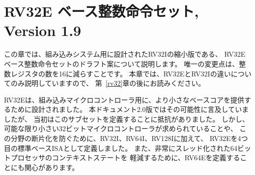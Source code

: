\begin{comment}
\chapter{RV32E Base Integer Instruction Set, Version 1.9}
\end{comment}
\chapter{RV32E ベース整数命令セット, Version 1.9}
\label{rv32e}

\begin{comment}
This chapter describes a draft proposal for the RV32E base integer
instruction set, which is a reduced version of RV32I designed for
embedded systems.  The only change is to reduce the number of integer
registers to 16.  This chapter only outlines the differences between
RV32E and RV32I, and so should be read after Chapter~\ref{rv32}.
\end{comment}

この章では、組み込みシステム用に設計されたRV32Iの縮小版である、
RV32Eベース整数命令セットのドラフト案について説明します。
唯一の変更点は、整数レジスタの数を16に減らすことです。
本章では、RV32EとRV32Iの違いについてのみ説明していますので、
第~\ref{rv32}章の後にお読みください。

\begin{commentary}
\begin{comment}
RV32E was designed to provide an even smaller base core for embedded
microcontrollers.  Although we had mentioned this possibility in
version 2.0 of this document, we initially resisted defining this
subset. However, given the demand for the smallest possible 32-bit
microcontroller, and in the interests of preempting fragmentation in
this space, we have now defined RV32E as a fourth standard base ISA in
addition to RV32I, RV64I, and RV128I.  There is also interest in
defining an RV64E to reduce context state for highly threaded 64-bit
processors.
\end{comment}

RV32Eは、組み込みマイクロコントローラ用に、より小さなベースコアを提供するために設計されました。 
本ドキュメント2.0版ではその可能性に言及していましたが、
当初はこのサブセットを定義することに抵抗がありました。
しかし、可能な限り小さい32ビットマイクロコントローラが求められていることや、
この分野の断片化を防ぐために、RV32I、RV64I、RV128Iに加えて、
RV32Eを4つ目の標準ベースISAとして定義しました。
また、非常にスレッド化された64ビットプロセッサのコンテキストステートを
軽減するために、RV64Eを定義することにも関心があります。
\end{commentary}

